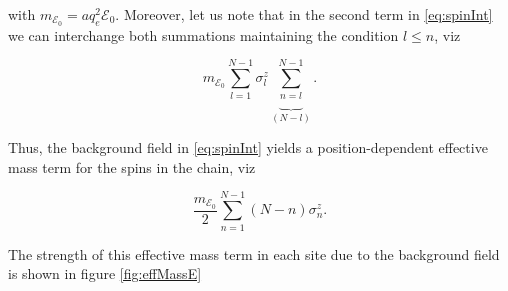 with $m_{\mathcal{E}_0} = aq_e^2\mathcal{E}_0$. Moreover, let us note that in the second term in \eqref{eq:spinInt} we can interchange both summations maintaining the condition $l\leq n$, viz

\begin{equation}
m_{\mathcal{E}_0} \sum_{l=1}^{N-1}\sigma^z_l\underbrace{\sum_{n=l}^{N-1}}_{(N-l)}.
\end{equation}

Thus, the background field in \eqref{eq:spinInt} yields a position-dependent effective mass term for the spins in the chain, viz

\begin{equation*}
	\frac{m_{\mathcal{E}_0}}{2} \sum_{n=1}^{N-1}(N-n)\sigma^z_n.
\end{equation*}

The strength of this effective mass term in each site due to the background field is shown in figure \ref{fig:effMassE}

